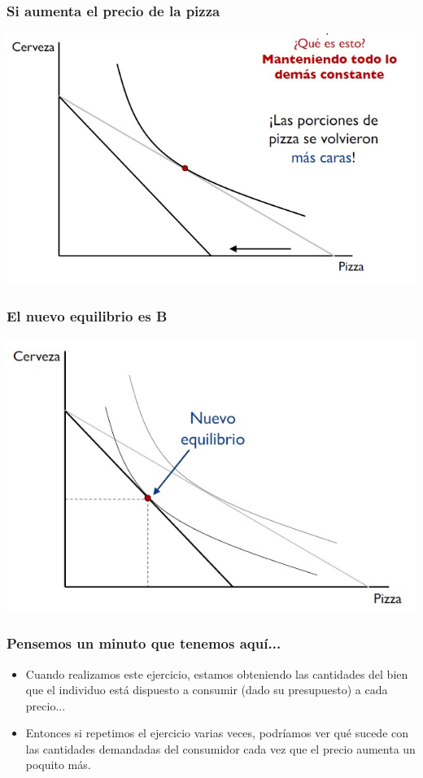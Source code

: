 \documentclass{beamer}
\begin{document}
\begin{frame}
\frametitle{Si aumenta el precio de la pizza}
\centering
\includegraphics[scale=0.6]{../Figures/Tema_02.20_rp18.jpg}
\end{frame}

\begin{frame}
\frametitle{El nuevo equilibrio es B}
\centering
\includegraphics[scale=0.6]{../Figures/Tema_02.22_rp20.jpg}
\end{frame}

\begin{frame}
\frametitle{Pensemos un minuto que tenemos aquí...}
\begin{itemize}
    \item Cuando realizamos este ejercicio, estamos obteniendo las cantidades del bien que el individuo está dispuesto a consumir (dado su presupuesto) a cada precio...
    \item Entonces si repetimos el ejercicio varias veces, podríamos ver qué sucede con las cantidades demandadas del consumidor cada vez que el precio aumenta un poquito más.
\end{itemize}
\end{frame}
\end{document}
